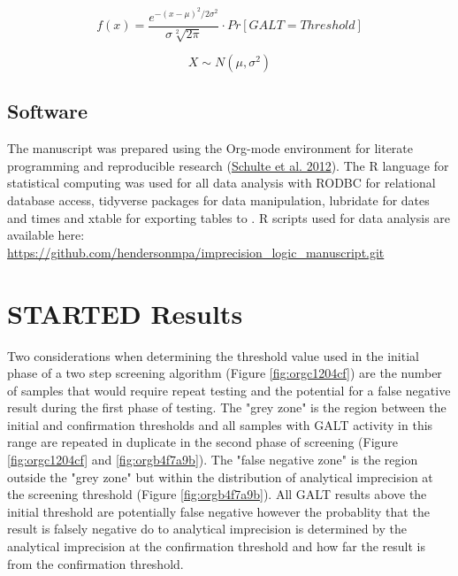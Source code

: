 \documentclass[review]{elsarticle}
\begin{document}
\begin{equation}\label{eq:scaled}
f(x) = \frac{e^{-(x-\mu)^2/2\sigma^2}}{\sigma \sqrt[2]{2\pi}} \cdot Pr[GALT = Threshold] 
\end{equation}

\begin{equation}\label{eq:error}
X \sim N(\mu, \sigma^2)
\end{equation}

\subsection*{Software}
\label{sec:orgd4e9dfc}
The manuscript was prepared using the Org-mode environment for
literate programming and reproducible research (\hyperlink{citeproc_bib_item_5}{Schulte et al. 2012}). The R language for statistical computing was used
for all data analysis with RODBC for relational database access,
tidyverse packages for data manipulation, lubridate for dates and
times and xtable for exporting tables to
. R scripts
used for data analysis are available here:
\url{https://github.com/hendersonmpa/imprecision\_logic\_manuscript.git}

\section*{{\bfseries\sffamily STARTED} Results}
\label{sec:org1548d3c}

Two considerations when determining the threshold value used in the
initial phase of a two step screening algorithm (Figure \ref{fig:orgc1204cf})
are the number of samples that would require repeat testing and the
potential for a false negative result during the first phase of
testing.  The "grey zone" is the region between the initial and
confirmation thresholds and all samples with GALT activity in this
range are repeated in duplicate in the second phase of screening
(Figure \ref{fig:orgc1204cf} and \ref{fig:orgb4f7a9b}). The "false negative zone"
is the region outside the "grey zone" but within the distribution of
analytical imprecision at the screening threshold (Figure
\ref{fig:orgb4f7a9b}). All GALT results above the initial threshold are
potentially false negative however the probablity that the result is
falsely negative do to analytical imprecision is determined by the
analytical imprecision at the confirmation threshold and how far the
result is from the confirmation threshold.
\end{document}
